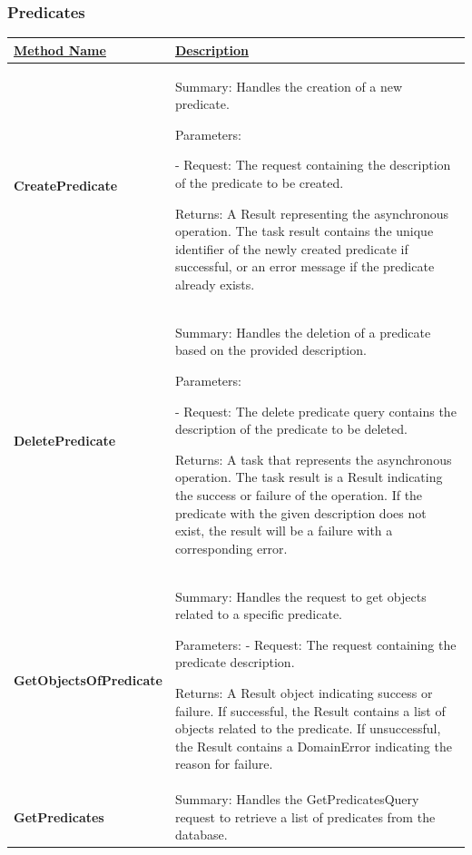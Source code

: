 

\newpage
\subsubsection{Predicates}
\begin{longtable}
    \centering
    \renewcommand{\arraystretch}{1.2}
    \begin{tabular}{|p{0.25\linewidth}|p{0.75\linewidth}|}
\hline
    \underline{Method Name} & \underline{Description} 
\\
\hline
    \textbf{CreatePredicate} & Summary: Handles the creation of a new predicate.
    
Parameters:

- Request: The request containing the description of the predicate to be created.

Returns: A Result representing the asynchronous operation. The task result contains the unique identifier of the newly created predicate if successful, or an error message if the predicate already exists.
\\
\hline
    \textbf{DeletePredicate} & Summary: Handles the deletion of a predicate based on the provided description.
    
Parameters:

- Request: The delete predicate query contains the description of the predicate to be deleted.

Returns: A task that represents the asynchronous operation. 	The task result is a Result indicating the success or failure of the operation. If the predicate with the given description does not exist, the result will be a failure with a corresponding error.
\\
\hline
    \textbf{GetObjectsOfPredicate} & Summary: Handles the request to get objects related to a specific predicate.
    
Parameters:
- Request: The request containing the predicate description.

Returns: A Result object indicating success or failure. If successful, the Result contains a list of objects related to the predicate. If unsuccessful, the Result contains a DomainError indicating the reason for failure.
\\
\hline
    \textbf{GetPredicates} & Summary: Handles the GetPredicatesQuery request to retrieve a list of predicates from the database.
   

\end{tabular}
\end{longtable}

